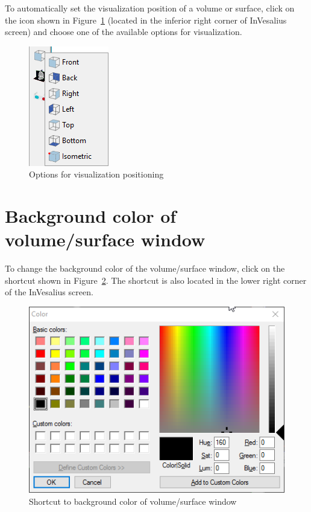 To automatically set the visualization position of a volume or surface, click on the icon shown in Figure~\ref{fig:3d_automatic_position} (located in the inferior right corner of InVesalius screen) and choose one of the available options for visualization.

\begin{figure}[!htb]
\centering
\includegraphics[scale=0.45]{../user_guide_figures/invesalius_screen/3d_automatic_position_en.png}
\caption{Options for visualization positioning}
\label{fig:3d_automatic_position}
\end{figure}

\section{Background color of volume/surface window}

To change the background color of the volume/surface window, click on the shortcut shown in Figure~\ref{fig:button_select_color_2}. The shortcut is also located in the lower right corner of the InVesalius screen.

\begin{figure}[!htb]
\centering
\includegraphics[scale=0.8]{../user_guide_figures/invesalius_screen/colour_button_en.png}
\caption{Shortcut to background color of volume/surface window}
\label{fig:button_select_color_2}
\end{figure}

